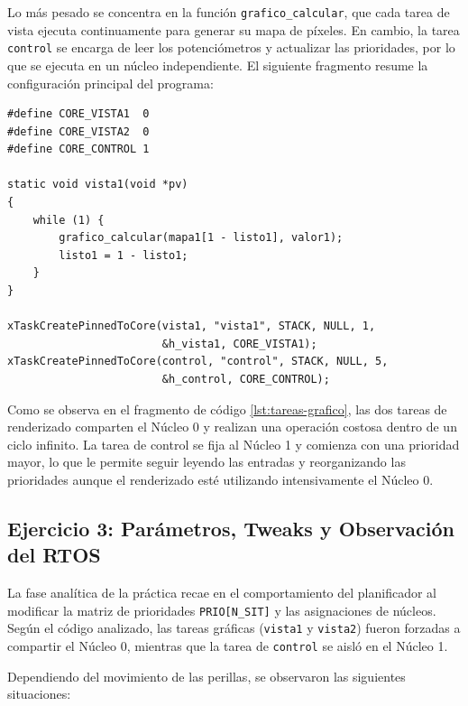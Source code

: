 \documentclass[12pt, letterpaper]{article}
\begin{document}
Lo más pesado se concentra en la función \texttt{grafico\_calcular}, que cada tarea de vista ejecuta continuamente para generar su mapa de píxeles. En cambio, la tarea \texttt{control} se encarga de leer los potenciómetros y actualizar las prioridades, por lo que se ejecuta en un núcleo independiente. El siguiente fragmento resume la configuración principal del programa:

\begin{lstlisting}[style=cstyle, caption={Distribución de las tareas y carga de procesamiento}, label={lst:tareas-grafico}]
#define CORE_VISTA1  0
#define CORE_VISTA2  0
#define CORE_CONTROL 1

static void vista1(void *pv)
{
    while (1) {
        grafico_calcular(mapa1[1 - listo1], valor1);
        listo1 = 1 - listo1;
    }
}

xTaskCreatePinnedToCore(vista1, "vista1", STACK, NULL, 1,
                        &h_vista1, CORE_VISTA1);
xTaskCreatePinnedToCore(control, "control", STACK, NULL, 5,
                        &h_control, CORE_CONTROL);
\end{lstlisting}

Como se observa en el fragmento de código \ref{lst:tareas-grafico}, las dos tareas de renderizado comparten el Núcleo 0 y realizan una operación costosa dentro de un ciclo infinito. La tarea de control se fija al Núcleo 1 y comienza con una prioridad mayor, lo que le permite seguir leyendo las entradas y reorganizando las prioridades aunque el renderizado esté utilizando intensivamente el Núcleo 0.

\subsection*{\fontsize{12}{17}\sffamily\selectfont Ejercicio 3: Parámetros, Tweaks y Observación del RTOS}

La fase analítica de la práctica recae en el comportamiento del planificador al modificar la matriz de prioridades \texttt{PRIO[N\_SIT]} y las asignaciones de núcleos. Según el código analizado, las tareas gráficas (\texttt{vista1} y \texttt{vista2}) fueron forzadas a compartir el Núcleo 0, mientras que la tarea de \texttt{control} se aisló en el Núcleo 1.

Dependiendo del movimiento de las perillas, se observaron las siguientes situaciones:
\end{document}
